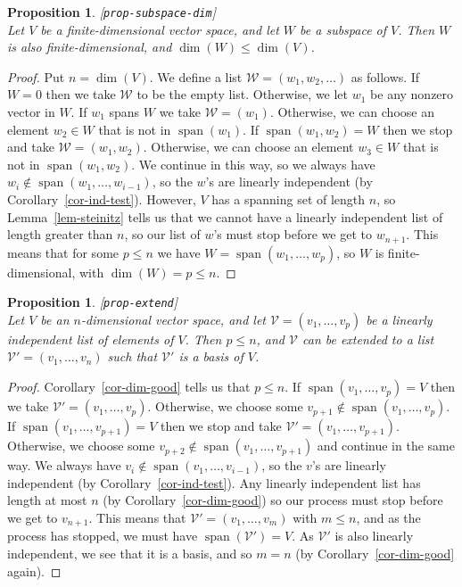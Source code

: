 \documentclass{amsart}
\newcommand{\lbl}[1]{\label{#1}\textup{[\texttt{#1}]}\ \\}
\newcommand{\lbl}{\label}
\newcommand{\spn}       {\operatorname{span}}
\newcommand{\CV}        {{\mathcal{V}}}
\newcommand{\CW}        {{\mathcal{W}}}
\renewcommand{\:}       {\colon}
\newtheorem{proposition}[theorem]{Proposition}
\theoremstyle{definition}
\begin{document}
\begin{proposition}\lbl{prop-subspace-dim}
 Let $V$ be a finite-dimensional vector space, and let $W$
 be a subspace of $V$.  Then $W$ is also finite-dimensional,
 and $\dim(W)\leq\dim(V)$.  
\end{proposition}
\begin{proof}
 Put $n=\dim(V)$.  We define a list $\CW=(w_1,w_2,\dotsc)$
 as follows.  If $W=0$ then we take $\CW$ to be the empty
 list.  Otherwise, we let $w_1$ be any nonzero vector in
 $W$.  If $w_1$ spans $W$ we take $\CW=(w_1)$.  Otherwise,
 we can choose an element $w_2\in W$ that is not in
 $\spn(w_1)$.  If $\spn(w_1,w_2)=W$ then we stop and take
 $\CW=(w_1,w_2)$.  Otherwise, we can choose an element
 $w_3\in W$ that is not in $\spn(w_1,w_2)$.  We continue in
 this way, so we always have
 $w_i\not\in\spn(w_1,\dotsc,w_{i-1})$, so the $w$'s are
 linearly independent (by Corollary~\ref{cor-ind-test}).
 However, $V$ has a spanning set of length $n$, so
 Lemma~\ref{lem-steinitz} tells us that we cannot have a
 linearly independent list of length greater than $n$, so
 our list of $w$'s must stop before we get to $w_{n+1}$.
 This means that for some $p\leq n$ we have
 $W=\spn(w_1,\dotsc,w_p)$, so $W$ is finite-dimensional,
 with $\dim(W)=p\leq n$.
\end{proof}

\begin{proposition}\lbl{prop-extend}
 Let $V$ be an $n$-dimensional vector space, and let
 $\CV=(v_1,\dotsc,v_p)$ be a linearly independent list of
 elements of $V$.  Then $p\leq n$, and $\CV$ can be extended
 to a list $\CV'=(v_1,\dotsc,v_n)$ such that $\CV'$ is a
 basis of $V$.
\end{proposition}
\begin{proof}
 Corollary~\ref{cor-dim-good} tells us that $p\leq n$.  If
 $\spn(v_1,\dotsc,v_p)=V$ then we take
 $\CV'=(v_1,\dotsc,v_p)$.  Otherwise, we choose some
 $v_{p+1}\not\in\spn(v_1,\dotsc,v_p)$.  If
 $\spn(v_1,\dotsc,v_{p+1})=V$ then we stop and take
 $\CV'=(v_1,\dotsc,v_{p+1})$.  Otherwise, we choose some
 $v_{p+2}\not\in\spn(v_1,\dotsc,v_{p+1})$ and continue in
 the same way.  We always have
 $v_i\not\in\spn(v_1,\dotsc,v_{i-1})$, so the $v$'s are
 linearly independent (by Corollary~\ref{cor-ind-test}).
 Any linearly independent list has length at most $n$ (by
 Corollary~\ref{cor-dim-good}) so our process must stop
 before we get to $v_{n+1}$.  This means that
 $\CV'=(v_1,\dotsc,v_m)$ with $m\leq n$, and as the process
 has stopped, we must have $\spn(\CV')=V$.  As $\CV'$ is
 also linearly independent, we see that it is a basis, and
 so $m=n$ (by Corollary~\ref{cor-dim-good} again).
\end{proof}
\end{document}
